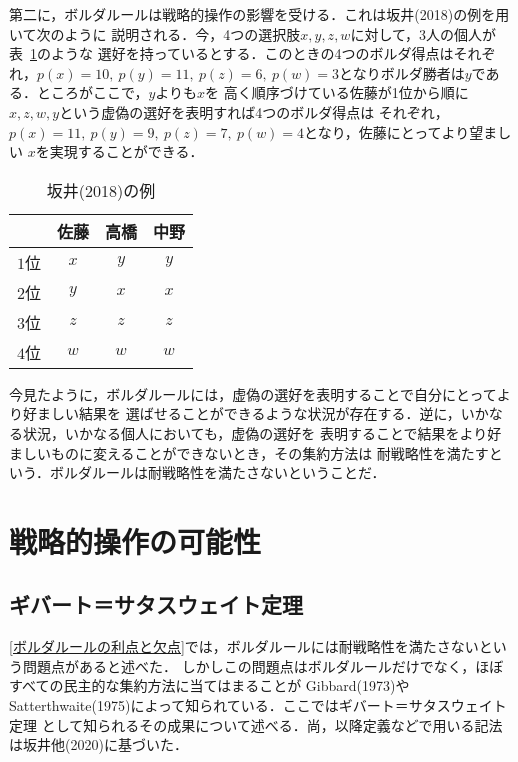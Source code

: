 \documentclass[dvipdfmx]{jsarticle}
\begin{document}
第二に，ボルダルールは戦略的操作の影響を受ける．これは坂井(2018)の例を用いて次のように
説明される．今，4つの選択肢$x,y,z,w$に対して，3人の個人が表~\ref{Sakai2018}のような
選好を持っているとする．このときの4つのボルダ得点はそれぞれ，$p(x) = 10,\ p(y) = 11,
\ p(z) = 6, \ p(w) = 3$となりボルダ勝者は$y$である．ところがここで，$y$よりも$x$を
高く順序づけている佐藤が1位から順に$x,z,w,y$という虚偽の選好を表明すれば4つのボルダ得点は
それぞれ，$p(x) = 11,\ p(y) = 9,\ p(z) = 7, \ p(w) = 4$となり，佐藤にとってより望ましい
$x$を実現することができる．

\begin{table}[h]
  \caption{坂井(2018)の例}\label{Sakai2018}
  \begin{center}
    \begin{tabular}{c|c|c|c} \hline
        & 佐藤 & 高橋 & 中野 \\ \hline
      $1$位 & $x$ & $y$ & $y$ \\
      $2$位 & $y$ & $x$ & $x$ \\
      $3$位 & $z$ & $z$ & $z$ \\
      $4$位 & $w$ & $w$ & $w$ \\ \hline
    \end{tabular}
  \end{center}
\end{table}

今見たように，ボルダルールには，虚偽の選好を表明することで自分にとってより好ましい結果を
選ばせることができるような状況が存在する．逆に，いかなる状況，いかなる個人においても，虚偽の選好を
表明することで結果をより好ましいものに変えることができないとき，その集約方法は
耐戦略性を満たすという．ボルダルールは耐戦略性を満たさないということだ．


\section{戦略的操作の可能性}
\subsection{ギバート＝サタスウェイト定理}
\ref{ボルダルールの利点と欠点}では，ボルダルールには耐戦略性を満たさないという問題点があると述べた．
しかしこの問題点はボルダルールだけでなく，ほぼすべての民主的な集約方法に当てはまることが
Gibbard(1973)やSatterthwaite(1975)によって知られている．ここではギバート＝サタスウェイト定理
として知られるその成果について述べる．尚，以降定義などで用いる記法は坂井他(2020)に基づいた．
\end{document}
